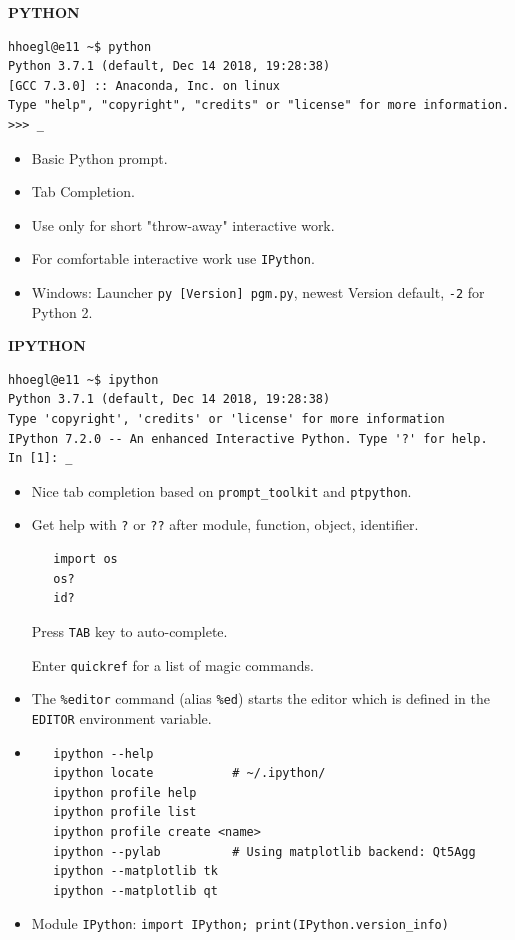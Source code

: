 \documentclass[9pt,a4wide]{extarticle}
\begin{document}
\bigskip
{\large\bf PYTHON}

\begin{verbatim}
hhoegl@e11 ~$ python
Python 3.7.1 (default, Dec 14 2018, 19:28:38) 
[GCC 7.3.0] :: Anaconda, Inc. on linux
Type "help", "copyright", "credits" or "license" for more information.
>>> _ 
\end{verbatim}

\begin{itemize}
\item Basic Python prompt.
\item Tab Completion.
\item Use only for short "throw-away" interactive work.
\item For comfortable interactive work use {\tt IPython}.
\item Windows: Launcher {\tt py [Version] pgm.py}, newest Version default, 
      {\tt -2} for Python 2.
\end{itemize}


\bigskip
{\large\bf IPYTHON}

\begin{verbatim}
hhoegl@e11 ~$ ipython
Python 3.7.1 (default, Dec 14 2018, 19:28:38) 
Type 'copyright', 'credits' or 'license' for more information
IPython 7.2.0 -- An enhanced Interactive Python. Type '?' for help.
In [1]: _
\end{verbatim}

\bigskip

\begin{itemize}

\item Nice tab completion based on {\tt prompt\_toolkit} and {\tt ptpython}.

\item Get help with {\tt ?} or {\tt ??} after module, function, 
   object, identifier.

   \begin{verbatim}
   import os
   os?
   id?
   \end{verbatim}

   Press {\tt TAB} key to auto-complete.

   Enter {\tt quickref} for a list of magic commands.

\item The {\tt \%editor} command (alias {\tt \%ed}) starts the editor which is 
   defined in the {\tt EDITOR} environment variable.

\item 

   \begin{verbatim}
   ipython --help
   ipython locate           # ~/.ipython/
   ipython profile help
   ipython profile list
   ipython profile create <name>
   ipython --pylab          # Using matplotlib backend: Qt5Agg
   ipython --matplotlib tk
   ipython --matplotlib qt
   \end{verbatim}

\item Module {\tt IPython}: 
   {\tt import IPython; print(IPython.version\_info)}

\end{itemize}
\end{document}
